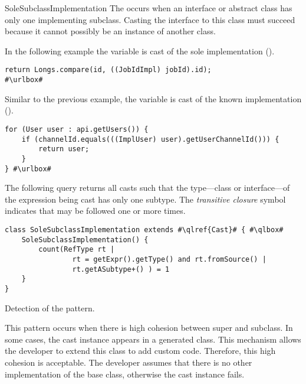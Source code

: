\begin{pattern}{SoleSubclassImplementation}
The \thisp{} occurs when an interface or abstract class has only one implementing subclass.
Casting the interface to this class must succeed because it cannot possibly be an instance of another class.

\instances{}
In the following example the 
variable is cast of the sole implementation ().

\def\urlvar{http://bit.ly/ow2_proactive_scheduling_2Ulcjfs}
\begin{verbatim}
return Longs.compare(id, ((JobIdImpl) jobId).id);
#\urlbox#
\end{verbatim}

Similar to the previous example,
the variable  is cast of the known implementation ().

\def\urlvar{http://bit.ly/Javacord_Javacord_2GwGjuV}
\begin{verbatim}
for (User user : api.getUsers()) {
    if (channelId.equals(((ImplUser) user).getUserChannelId())) {
        return user;
    }
} #\urlbox#
\end{verbatim}


\detection{}
The following query returns all casts such that the type---class or interface---of the expression being cast has only one subtype.
The \emph{transitive closure} symbol \code{+} indicates that  may be followed one or more times.

\begin{listing}
\begin{verbatim}
class SoleSubclassImplementation extends #\qlref{Cast}# { #\qlbox#
	SoleSubclassImplementation() {
		count(RefType rt | 
				rt = getExpr().getType() and rt.fromSource() | 
				rt.getASubtype+() ) = 1
	}
}
\end{verbatim}
\caption{Detection of the \thisp{} pattern.}
\label{lst:ql:SoleSubclassImplementationCast}
\end{listing}


\issues{}
This pattern occurs when there is high cohesion between super and subclass.
In some cases, the cast instance appears in a generated class.
This mechanism allows the developer to extend this class to add custom code.
Therefore, this high cohesion is acceptable.
The developer assumes that there is no other implementation of the base class,
otherwise the cast instance fails.

\end{pattern}
